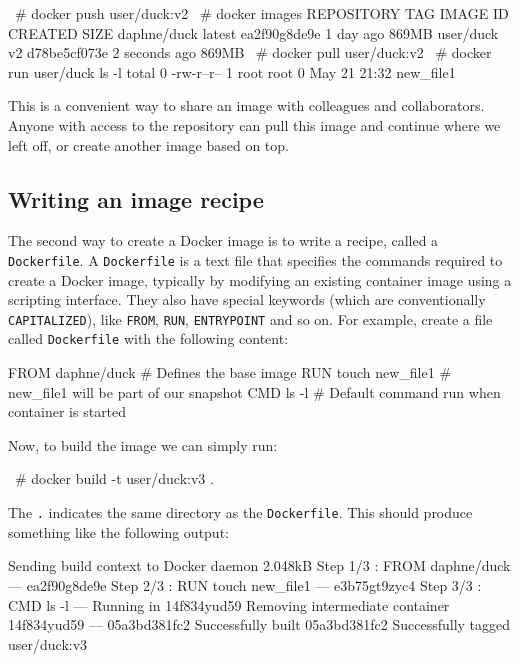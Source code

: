 \documentclass[12pt,initial,twoside,maitrise]{dms}
\def\inline{\lstinline[basicstyle=\ttfamily]}
\numberwithin{equation}{section}
\numberwithin{table}{chapter}
\numberwithin{figure}{chapter}
\begin{document}
\begin{pclisting}
~# docker push user/duck:v2
~# docker images
REPOSITORY    TAG        IMAGE ID         CREATED          SIZE
daphne/duck   latest     ea2f90g8de9e     1 day ago        869MB
user/duck     v2         d78be5cf073e     2 seconds ago    869MB
~# docker pull user/duck:v2
~# docker run user/duck ls -l
total 0
-rw-r--r-- 1 root root 0 May 21 21:32 new_file1
\end{pclisting}

This is a convenient way to share an image with colleagues and collaborators. Anyone with access to the repository can pull this image and continue where we left off, or create another image based on top.

\subsection{Writing an image recipe}

The second way to create a Docker image is to write a recipe, called a \inline{Dockerfile}. A \inline{Dockerfile} is a text file that specifies the commands required to create a Docker image, typically by modifying an existing container image using a scripting interface. They also have special keywords (which are conventionally \inline{CAPITALIZED}), like \inline{FROM}, \inline{RUN}, \inline{ENTRYPOINT} and so on. For example, create a file called \inline{Dockerfile} with the following content:

\begin{filelisting}
FROM daphne/duck       # Defines the base image
RUN touch new_file1   # new_file1 will be part of our snapshot
CMD ls -l             # Default command run when container is started
\end{filelisting}

Now, to build the image we can simply run:

\begin{pclisting}
~# docker build -t user/duck:v3 .
\end{pclisting}

The \inline{.} indicates the same directory as the \inline{Dockerfile}. This should produce something like the following output:

\begin{pclisting}
Sending build context to Docker daemon  2.048kB
Step 1/3 : FROM daphne/duck
--- ea2f90g8de9e
Step 2/3 : RUN touch new_file1
--- e3b75gt9zyc4
Step 3/3 : CMD ls -l
--- Running in 14f834yud59
Removing intermediate container 14f834yud59
--- 05a3bd381fc2
Successfully built 05a3bd381fc2
Successfully tagged user/duck:v3
\end{pclisting}
\end{document}
